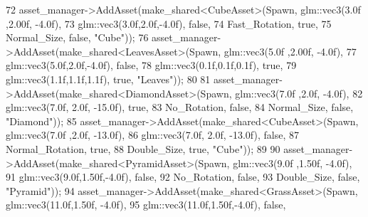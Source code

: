\begin{DoxyCode}
72         asset\_manager->AddAsset(make\_shared<CubeAsset>(Spawn, glm::vec3(3.0f ,2.00f, -4.0f),
73                                                        glm::vec3(3.0f,2.0f,-4.0f), \textcolor{keyword}{false},
74                                                        Fast\_Rotation, \textcolor{keyword}{true},
75                                                        Normal\_Size, \textcolor{keyword}{false}, \textcolor{stringliteral}{"Cube"}));
76         asset\_manager->AddAsset(make\_shared<LeavesAsset>(Spawn, glm::vec3(5.0f ,2.00f, -4.0f),
77                                                          glm::vec3(5.0f,2.0f,-4.0f), \textcolor{keyword}{false},
78                                                          glm::vec3(0.1f,0.1f,0.1f), \textcolor{keyword}{true},
79                                                          glm::vec3(1.1f,1.1f,1.1f), \textcolor{keyword}{true}, \textcolor{stringliteral}{"Leaves"}));
80                                                          
81         asset\_manager->AddAsset(make\_shared<DiamondAsset>(Spawn, glm::vec3(7.0f ,2.0f, -4.0f),
82                                                           glm::vec3(7.0f, 2.0f, -15.0f), \textcolor{keyword}{true},
83                                                           No\_Rotation, \textcolor{keyword}{false},
84                                                           Normal\_Size, \textcolor{keyword}{false}, \textcolor{stringliteral}{"Diamond"}));
85         asset\_manager->AddAsset(make\_shared<CubeAsset>(Spawn, glm::vec3(7.0f ,2.0f, -13.0f),
86                                                           glm::vec3(7.0f, 2.0f, -13.0f), \textcolor{keyword}{false},
87                                                           Normal\_Rotation, \textcolor{keyword}{true},
88                                                           Double\_Size, \textcolor{keyword}{true}, \textcolor{stringliteral}{"Cube"}));
89                                                           
90         asset\_manager->AddAsset(make\_shared<PyramidAsset>(Spawn, glm::vec3(9.0f ,1.50f, -4.0f),
91                                                           glm::vec3(9.0f,1.50f,-4.0f), \textcolor{keyword}{false},
92                                                           No\_Rotation, \textcolor{keyword}{false},
93                                                           Double\_Size, \textcolor{keyword}{false}, \textcolor{stringliteral}{"Pyramid"})); 
94         asset\_manager->AddAsset(make\_shared<GrassAsset>(Spawn, glm::vec3(11.0f,1.50f, -4.0f), 
95                                                         glm::vec3(11.0f,1.50f,-4.0f), \textcolor{keyword}{false},

\end{DoxyCode}
